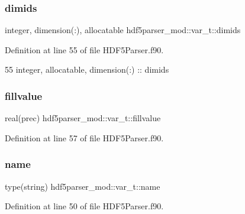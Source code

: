 \subsubsection{\texorpdfstring{dimids}{dimids}}
{\footnotesize\ttfamily integer, dimension(\+:), allocatable hdf5parser\+\_\+mod\+::var\+\_\+t\+::dimids\hspace{0.3cm}{\ttfamily [private]}}



Definition at line 55 of file H\+D\+F5\+Parser.\+f90.


\begin{DoxyCode}
55         \textcolor{keywordtype}{integer}, \textcolor{keywordtype}{allocatable}, \textcolor{keywordtype}{dimension(:)} :: dimids
\end{DoxyCode}
\mbox{\label{structhdf5parser__mod_1_1var__t_a9797930ec0a3b3da593f68618098a929}} 
\subsubsection{\texorpdfstring{fillvalue}{fillvalue}}
{\footnotesize\ttfamily real(prec) hdf5parser\+\_\+mod\+::var\+\_\+t\+::fillvalue\hspace{0.3cm}{\ttfamily [private]}}



Definition at line 57 of file H\+D\+F5\+Parser.\+f90.

\mbox{\label{structhdf5parser__mod_1_1var__t_a226fa25884cdec5f1aa1dea1296fcb35}} 
\subsubsection{\texorpdfstring{name}{name}}
{\footnotesize\ttfamily type(string) hdf5parser\+\_\+mod\+::var\+\_\+t\+::name\hspace{0.3cm}{\ttfamily [private]}}



Definition at line 50 of file H\+D\+F5\+Parser.\+f90.


